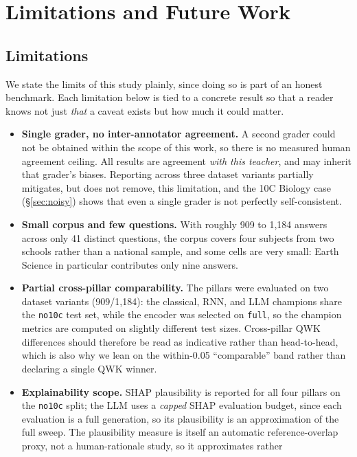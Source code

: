 \chapter{Limitations and Future Work}
\label{ch:limitations}

\section{Limitations}
We state the limits of this study plainly, since doing so is part of an honest benchmark. Each
limitation below is tied to a concrete result so that a reader knows not just \emph{that} a caveat
exists but how much it could matter.

\begin{itemize}[leftmargin=1.4em]
  \item \textbf{Single grader, no inter-annotator agreement.} A second grader could not be obtained
  within the scope of this work, so there is no measured human agreement ceiling. All results are
  agreement \emph{with this teacher}, and may inherit that grader's biases. Reporting across three
  dataset variants partially mitigates, but does not remove, this limitation, and the 10C Biology case
  (\S\ref{sec:noisy}) shows that even a single grader is not perfectly self-consistent.
  \item \textbf{Small corpus and few questions.} With roughly 909 to 1{,}184 answers across only 41
  distinct questions, the corpus covers four subjects from two schools rather than a national sample,
  and some cells are very small: Earth Science in particular contributes only nine answers.
  \item \textbf{Partial cross-pillar comparability.} The pillars were evaluated on two dataset
  variants (909/1{,}184): the classical, RNN, and LLM champions share the \texttt{no10c} test set,
  while the encoder was selected on \texttt{full}, so the champion metrics are computed on slightly
  different test sizes. Cross-pillar QWK differences should therefore be read as indicative rather than
  head-to-head, which is also why we lean on the within-0.05 ``comparable'' band rather than declaring
  a single QWK winner.
  \item \textbf{Explainability scope.} SHAP plausibility is reported for all four pillars on the
  \texttt{no10c} split; the LLM uses a \emph{capped} SHAP evaluation budget, since each evaluation is a
  full generation, so its plausibility is an approximation of the full sweep. The plausibility measure is
  itself an automatic reference-overlap proxy, not a human-rationale study, so it approximates rather

\end{itemize}
